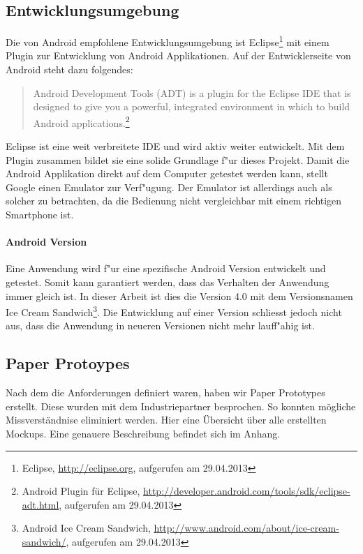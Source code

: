 \subsection{Entwicklungsumgebung}
Die von Android empfohlene Entwicklungsumgebung ist Eclipse\footnote{Eclipse, \url{http://eclipse.org}, aufgerufen am 29.04.2013}  mit einem Plugin zur Entwicklung von Android Applikationen. Auf der Entwicklerseite von Android steht dazu folgendes:
\begin{quotation}
Android Development Tools (ADT) is a plugin for the Eclipse IDE that is designed to give you a powerful, integrated environment in which to build Android applications.\footnote{Android Plugin f\"{u}r Eclipse, \url{http://developer.android.com/tools/sdk/eclipse-adt.html}, aufgerufen am 29.04.2013} 
\end{quotation}
Eclipse ist eine weit verbreitete IDE und wird aktiv weiter entwickelt. Mit dem Plugin zusammen bildet sie eine solide Grundlage f"{u}r dieses Projekt.
Damit die Android Applikation direkt auf dem Computer getestet werden kann, stellt Google einen Emulator zur Verf"{u}gung. Der Emulator ist allerdings auch als solcher zu betrachten, da die Bedienung nicht vergleichbar mit einem richtigen Smartphone ist.

\paragraph{Android Version}
Eine Anwendung wird f"{u}r eine spezifische Android Version entwickelt und getestet. Somit kann garantiert werden, dass das Verhalten der Anwendung immer gleich ist. In dieser Arbeit ist dies die Version 4.0 mit dem Versionsnamen Ice Cream Sandwich\footnote{Android Ice Cream Sandwich, \url{http://www.android.com/about/ice-cream-sandwich/}, aufgerufen am 29.04.2013}.
Die Entwicklung auf einer Version schliesst jedoch nicht aus, dass die Anwendung in neueren Versionen nicht mehr lauff"{a}hig ist.

\subsection{Paper Protoypes}
Nach dem die Anforderungen definiert waren, haben wir Paper Prototypes erstellt. Diese wurden mit dem Industriepartner besprochen. So konnten mögliche Missverständnise eliminiert werden. Hier eine Übersicht über alle erstellten Mockups. Eine genauere Beschreibung befindet sich im Anhang.

